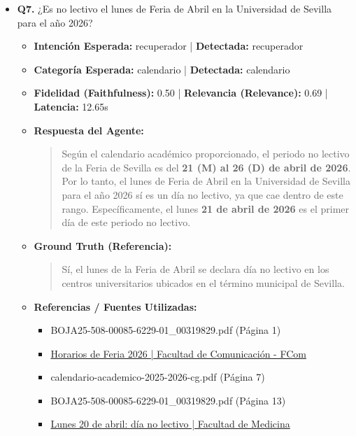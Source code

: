 \documentclass[12pt,a4paper,oneside]{report}
\begin{document}
\begin{itemize}
  
\item \textbf{Q7.} ¿Es no lectivo el lunes de Feria de Abril en la Universidad de Sevilla para el año 2026? \\
        \begin{itemize}
          \item \textbf{Intención Esperada:} recuperador | \textbf{Detectada:} recuperador
          \item \textbf{Categoría Esperada:} calendario | \textbf{Detectada:} calendario
          \item \textbf{Fidelidad (Faithfulness):} 0.50 | \textbf{Relevancia (Relevance):} 0.69 | \textbf{Latencia:} 12.65s
          \item \textbf{{Respuesta del Agente:}} \\
                \begin{quote}
Según el calendario académico proporcionado, el periodo no lectivo de la Feria de Sevilla es del \textbf{21 (M) al 26 (D) de abril de 2026}. Por lo tanto, el lunes de Feria de Abril en la Universidad de Sevilla para el año 2026 sí es un día no lectivo, ya que cae dentro de este rango. Específicamente, el lunes \textbf{21 de abril de 2026} es el primer día de este periodo no lectivo.
                \end{quote}
          \item \textbf{{Ground Truth (Referencia):}} \\
                \begin{quote}
Sí, el lunes de la Feria de Abril se declara día no lectivo en los centros universitarios ubicados en el término municipal de Sevilla.
                \end{quote}
          \item \textbf{{Referencias / Fuentes Utilizadas:}} \\
                \begin{itemize}
                  \item BOJA25-508-00085-6229-01\_00319829.pdf (Página 1)
                  \item \href{https://fcom.us.es/index.php/noticiasfcom/actualidad/horarios-de-feria-2026}{Horarios de Feria 2026 | Facultad de Comunicación - FCom}
                  \item calendario-academico-2025-2026-cg.pdf (Página 7)
                  \item BOJA25-508-00085-6229-01\_00319829.pdf (Página 13)
                  \item \href{https://medicina.us.es/noticia/lunes-20-de-abril-dia-no-lectivo}{Lunes 20 de abril: día no lectivo | Facultad de Medicina}

\end{itemize}
\end{itemize}
\end{itemize}
\end{document}
